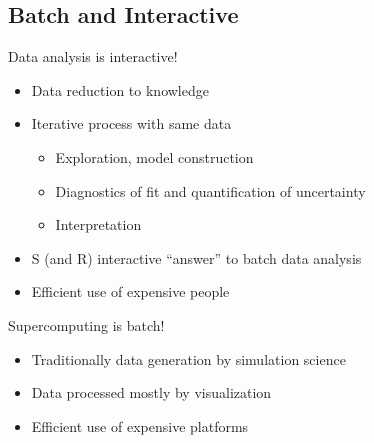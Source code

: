 \subsection{Batch and Interactive}
\makesubcontentsslidessec

\begin{frame}
  \begin{block}{Data analysis is interactive!}
    \pause
    \begin{itemize}[<+-|alert@+>]
    \item Data reduction to knowledge
    \item Iterative process with same data
      \begin{itemize}
      \item Exploration, model construction
      \item Diagnostics of fit and quantification of uncertainty
      \item Interpretation
      \end{itemize}
    \item S (and R) interactive ``answer'' to batch data analysis
    \item Efficient use of expensive people
    \end{itemize}
  \end{block}
  \begin{block}{Supercomputing is batch!}
    \pause
    \begin{itemize}[<+-|alert@+>]
    \item Traditionally data generation by simulation science
    \item Data processed mostly by visualization
    \item Efficient use of expensive platforms
    \end{itemize}
  \end{block}
\end{frame}

